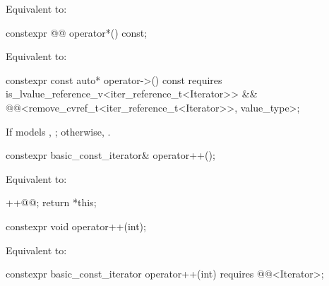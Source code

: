 \begin{itemdescr}
\pnum
\effects
Equivalent to: 
\end{itemdescr}

%
\begin{itemdecl}
constexpr @@ operator*() const;
\end{itemdecl}

\begin{itemdescr}
\pnum
\effects
Equivalent to: 
\end{itemdescr}

%
\begin{itemdecl}
constexpr const auto* operator->() const
  requires is_lvalue_reference_v<iter_reference_t<Iterator>> &&
           @@<remove_cvref_t<iter_reference_t<Iterator>>, value_type>;
\end{itemdecl}

\begin{itemdescr}
\pnum
\returns
If  models ,
;
otherwise, .
\end{itemdescr}

%
\begin{itemdecl}
constexpr basic_const_iterator& operator++();
\end{itemdecl}

\begin{itemdescr}
\pnum
\effects
Equivalent to:
\begin{codeblock}
++@@;
return *this;
\end{codeblock}
\end{itemdescr}

%
\begin{itemdecl}
constexpr void operator++(int);
\end{itemdecl}

\begin{itemdescr}
\pnum
\effects
Equivalent to: 
\end{itemdescr}

%
\begin{itemdecl}
constexpr basic_const_iterator operator++(int) requires @@<Iterator>;
\end{itemdecl}

